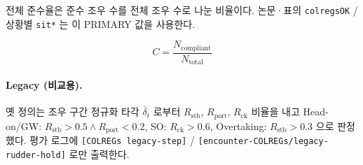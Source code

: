 \documentclass{article}
\begin{document}
전체 준수율은 준수 조우 수를 전체 조우 수로 나눈 비율이다.
논문·표의 \texttt{colregsOK} / 상황별 \texttt{sit*} 는 이 PRIMARY 값을 사용한다.

\begin{equation}
  C = \frac{N_{\mathrm{compliant}}}{N_{\mathrm{total}}}
\end{equation}

\paragraph{Legacy (비교용).}
옛 정의는 조우 구간 정규화 타각 $\bar{\delta}_t$ 로부터
$R_{\mathrm{stb}}$, $R_{\mathrm{port}}$, $R_{\mathrm{ck}}$ 비율을 내고
Head-on/GW: $R_{\mathrm{stb}}{>}0.5 \wedge R_{\mathrm{port}}{<}0.2$,
SO: $R_{\mathrm{ck}}{>}0.6$,
Overtaking: $R_{\mathrm{stb}}{>}0.3$
으로 판정했다. 평가 로그에 \texttt{[COLREGs legacy-step]} /
\texttt{[encounter-COLREGs/legacy-rudder-hold]} 로만 출력한다.
\end{document}
